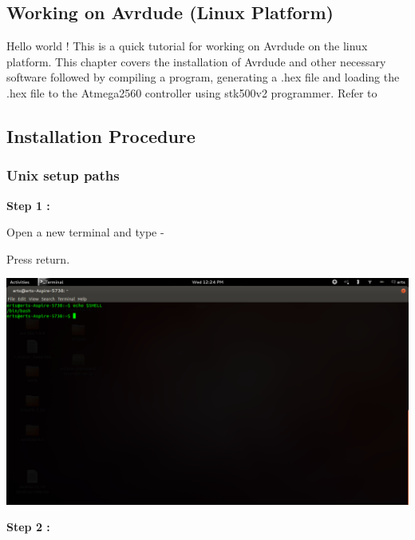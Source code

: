 \begin{flushleft}

\chapter{Working on Avrdude (Linux Platform)}



\medskip
Hello world ! This is a quick tutorial for working on Avrdude on the linux platform. This chapter covers the installation of Avrdude and other necessary software followed by compiling a program, generating a .hex file and loading the .hex file to the Atmega2560 controller using stk500v2 programmer. Refer to \cite{installation}\cite{loading}\cite{binutils}\cite{avr-libc}\cite{avrdude}



\section{\textbf{Installation Procedure}}

\subsection{Unix setup paths}
\textbf{Step 1 : }
\medskip

Open a new terminal and type - 


\medskip

\medskip

Press return.
\medskip

\includegraphics[scale=0.3]{f1}

\medskip

\textbf{Step 2 :}

\medskip


\end{flushleft}
